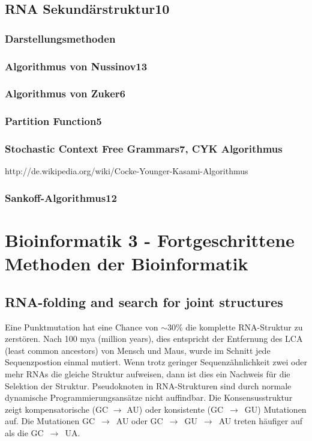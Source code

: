 \documentclass[%
   final,      %
   paper=a4,%
   paper=portrait, %
   pagesize=auto, %
   fontsize=11pt,%
 ]{scrreprt} %
\begin{document}
\section{RNA Sekundärstruktur10}
\subsection{Darstellungsmethoden}
\subsection{Algorithmus von Nussinov13}
\subsection{Algorithmus von Zuker6}
\subsection{Partition Function5}
\subsection{Stochastic Context Free Grammars7, CYK Algorithmus}
http://de.wikipedia.org/wiki/Cocke-Younger-Kasami-Algorithmus
\subsection{Sankoff-Algorithmus12}





\chapter{Bioinformatik 3 - Fortgeschrittene Methoden der Bioinformatik}

\section{RNA-folding and search for joint structures}
Eine Punktmutation hat eine Chance von $\sim$30\% die komplette RNA-Struktur zu zerstören. Nach 100 mya (million years), dies entspricht der Entfernung des LCA (least common ancestors) von Mensch und Maus, wurde im Schnitt jede Sequenzpostion einmal mutiert. Wenn trotz geringer Sequenzähnlichkeit zwei oder mehr RNAs die gleiche Struktur aufweisen, dann ist dies ein Nachweis für die Selektion der Struktur. Pseudoknoten in RNA-Strukturen sind durch normale dynamische Programmierungsansätze nicht auffindbar. Die Konsensusstruktur zeigt kompensatorische (GC $\rightarrow$ AU) oder konsistente (GC~$\rightarrow$~GU) Mutationen auf. Die Mutationen GC~$\rightarrow$~AU oder GC~$\rightarrow$~GU~$\rightarrow$~AU treten häufiger auf als die GC~$\rightarrow$~UA.
\end{document}
